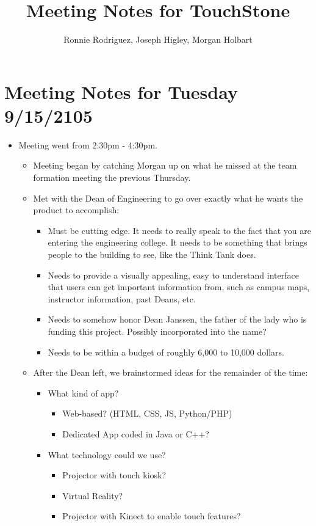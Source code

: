 \documentclass[]{article}
\title{Meeting Notes for TouchStone}
\author{Ronnie Rodriguez, Joseph Higley, Morgan Holbart}
\begin{document}
\maketitle

\section{Meeting Notes for Tuesday 9/15/2105}
\begin{itemize}
	\item Meeting went from 2:30pm - 4:30pm.
	\begin{itemize}
		\item Meeting began by catching Morgan up on what he missed at the team formation meeting the previous Thursday.
		\item Met with the Dean of Engineering to go over exactly what he wants the product to accomplish:
			\begin{itemize}
				\item Must be cutting edge. It needs to really speak to the fact that you are entering the engineering college. It needs to be something that brings people to the building to see, like the Think Tank does.
				\item  Needs to provide a visually appealing, easy to understand interface that users can get important information from, such as campus maps, instructor information, past Deans, etc.
				\item Needs to somehow honor Dean Janssen, the father of the lady who is funding this project. Possibly incorporated into the name?
				\item Needs to be within a budget of roughly 6,000 to 10,000 dollars.
			\end{itemize}
		\item After the Dean left, we brainstormed ideas for the remainder of the time:
			\begin{itemize}
				\item What kind of app?
					\begin{itemize}
						\item Web-based? (HTML, CSS, JS, Python/PHP)
						\item Dedicated App coded in Java or C++?
					\end{itemize}
				\item What technology could we use?
					\begin{itemize}
						\item Projector with touch kiosk?
						\item Virtual Reality?
						\item Projector with Kinect to enable touch features?
					\end{itemize}
			\end{itemize}		
	\end{itemize}
\end{itemize}
\end{document}
